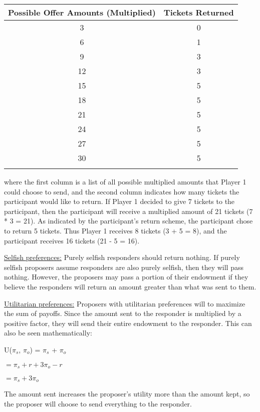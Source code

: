 \documentclass[12pt]{article}
\begin{document}
\begin{center}
\begin{tabular}{ c c }
\hline \hline
 Possible Offer Amounts (Multiplied) & Tickets Returned \\ 
 \hline
3 & 0  \\  
6 & 1 \\  
9 & 3  \\  
12 & 3  \\  
15 & 5   \\  
18 & 5  \\  
21 & 5 \\  
24 & 5 \\  
27 & 5 \\  
30 & 5 \\  
\hline \hline \\
\end{tabular}
\end{center} 


where the first column is a list of all possible multiplied amounts that Player 1 could choose to send, and the second column indicates how many tickets the participant would like to return. If Player 1 decided to give 7 tickets to the participant, then the participant will receive a multiplied amount of 21 tickets (7 * 3 = 21). As indicated by the participant\rq s return scheme, the participant chose to return 5 tickets. Thus Player 1 receives 8 tickets (3 + 5 =  8), and the participant receives 16 tickets (21 - 5 = 16).

\underline{Selfish preferences:} Purely selfish responders should return nothing. If purely selfish proposers assume responders are also purely selfish, then they will pass nothing. However, the proposers may pass a portion of their endowment if they believe the responders will return an amount greater than what was sent to them.


\underline{Utilitarian preferences:} Proposers with utilitarian preferences will to maximize the sum of payoffs. Since the amount sent to the responder is multiplied by a positive factor, they will send their entire endowment to the responder. This can also be seen mathematically:

U(\(\pi_{s}\), \(\pi_{o}\)) = \(\pi_{s}\) + \(\pi_{o}\)

\hspace{17mm} \( = \pi_{s} + r + 3\pi_{o} - r \)

\hspace{17mm} \( = \pi_{s} + 3\pi_{o} \)

The amount sent increases the proposer\rq s utility more than the amount kept, so the proposer will choose to send everything to the responder.
	
\end{document}

